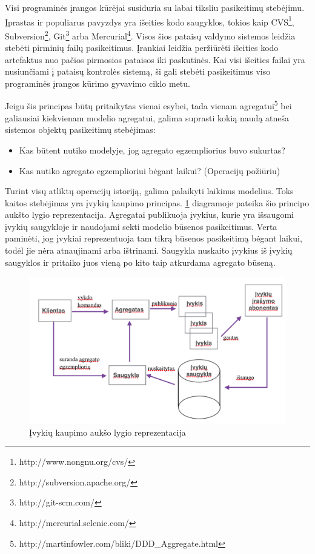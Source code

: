 Visi programinės įrangos kūrėjai susiduria su labai tiksliu pasikeitimų stebėjimu. Įprastas ir populiarus pavyzdys yra išeities kodo saugyklos, tokios kaip CVS\footnote{http://www.nongnu.org/cvs/}, Subversion\footnote{http://subversion.apache.org/}, Git\footnote{http://git-scm.com/} arba Mercurial\footnote{http://mercurial.selenic.com/}. Visos šios pataisų valdymo sistemos leidžia stebėti pirminių failų pasikeitimus. Įrankiai leidžia peržiūrėti išeities kodo artefaktus nuo pačios pirmosios pataisos iki paskutinės. Kai visi išeities failai yra nusiunčiami į pataisų kontrolės sistemą, ši gali stebėti pasikeitimus viso programinės įrangos kūrimo gyvavimo ciklo metu.

Jeigu šis principas būtų pritaikytas vienai esybei, tada vienam agregatui\footnote{http://martinfowler.com/bliki/DDD\_Aggregate.html} bei galiausiai kiekvienam modelio agregatui, galima suprasti kokią naudą atneša sistemos objektų pasikeitimų stebėjimas:

\begin{itemize}

	\item Kas būtent nutiko modelyje, jog agregato egzempliorius buvo sukurtas?

	\item Kas nutiko agregato egzemplioriui bėgant laikui? (Operacijų požiūriu)

\end{itemize}

Turint visų atliktų operacijų istoriją, galima palaikyti laikinus modelius. Toks kaitos stebėjimas yra įvykių kaupimo principas. \ref{pic:es} diagramoje pateika šio principo aukšto lygio reprezentacija. Agregatai publikuoja įvykius, kurie yra išsaugomi įvykių saugykloje ir naudojami sekti modelio būsenos pasikeitimus. Verta paminėti, jog įvykiai reprezentuoja tam tikrą būsenos pasikeitimą bėgant laikui, todėl jie nėra atnaujinami arba ištrinami. Saugykla nuskaito įvykius iš įvykių saugyklos ir pritaiko juos vieną po kito taip atkurdama agregato būseną. 

\begin{figure}[ht]
	\centering
	\includegraphics[width=0.9\linewidth]{pics/es.png}
	\caption{Įvykių kaupimo aukšo lygio reprezentacija}
	\label{pic:es}
\end{figure}

